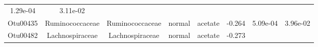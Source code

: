 \documentclass[11pt,]{article}
\begin{document}
\begin{longtable}[]{@{}cccccccc@{}}
\begin{minipage}[t]{0.08\columnwidth}
1.29e-04\strut
\end{minipage} & \begin{minipage}[t]{0.08\columnwidth}\centering\strut
3.11e-02\strut
\end{minipage}\tabularnewline
\begin{minipage}[t]{0.08\columnwidth}\centering\strut
Otu00435\strut
\end{minipage} & \begin{minipage}[t]{0.15\columnwidth}\centering\strut
Ruminococcaceae\strut
\end{minipage} & \begin{minipage}[t]{0.15\columnwidth}\centering\strut
Ruminococcaceae\strut
\end{minipage} & \begin{minipage}[t]{0.08\columnwidth}\centering\strut
normal\strut
\end{minipage} & \begin{minipage}[t]{0.09\columnwidth}\centering\strut
acetate\strut
\end{minipage} & \begin{minipage}[t]{0.07\columnwidth}\centering\strut
-0.264\strut
\end{minipage} & \begin{minipage}[t]{0.08\columnwidth}\centering\strut
5.09e-04\strut
\end{minipage} & \begin{minipage}[t]{0.08\columnwidth}\centering\strut
3.96e-02\strut
\end{minipage}\tabularnewline
\begin{minipage}[t]{0.08\columnwidth}\centering\strut
Otu00482\strut
\end{minipage} & \begin{minipage}[t]{0.15\columnwidth}\centering\strut
Lachnospiraceae\strut
\end{minipage} & \begin{minipage}[t]{0.15\columnwidth}\centering\strut
Lachnospiraceae\strut
\end{minipage} & \begin{minipage}[t]{0.08\columnwidth}\centering\strut
normal\strut
\end{minipage} & \begin{minipage}[t]{0.09\columnwidth}\centering\strut
acetate\strut
\end{minipage} & \begin{minipage}[t]{0.07\columnwidth}\centering\strut
-0.273\strut
\end{minipage} & \begin{minipage}[t]{0.08\columnwidth}\centering\strut

\end{minipage}
\end{longtable}
\end{document}
